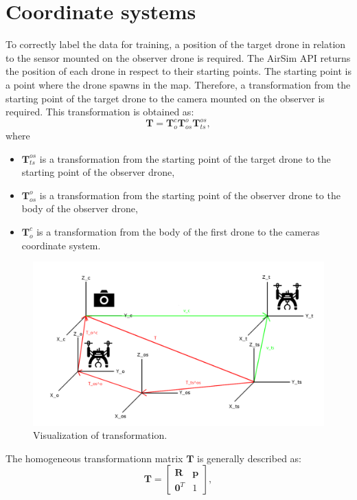 \documentclass[twoside]{ctuthesis}
\theoremstyle{plain}
\theoremstyle{definition}
\theoremstyle{note}
\begin{document}
\section{Coordinate systems}
To correctly label the data for training, a position of the target drone in relation to the sensor mounted on the observer drone is required. The AirSim API returns the position of each drone in respect to their starting points. The starting point is a point where the drone spawns in the map. Therefore, a transformation from the starting point of the target drone to the camera mounted on the observer is required. This transformation is obtained as:
\begin{equation}
	\textbf{T}=\textbf{T}_{o}^{c}\textbf{T}_{os}^{o}\textbf{T}_{ts}^{os},
\end{equation}
where
\begin{itemize}
	\item $\textbf{T}_{ts}^{os}$ is a transformation from the starting point of the target drone to the starting point of the observer drone,
	\item $\textbf{T}_{os}^{o}$ is a transformation from the starting point of the observer drone to the body of the observer drone,
	\item $\textbf{T}_{o}^{c}$ is a transformation from the body of the first drone to the cameras coordinate system.
\end{itemize}
\begin{figure}
	\centering
	\includegraphics[width=\textwidth]{coord_schema.png}
	\caption{Visualization of transformation.}
	\label{fig:trans}
\end{figure}
The homogeneous transformationn matrix $\textbf{T}$ is generally described as:
\begin{equation}
	\textbf{T}=\begin{bmatrix}
		\textbf{R} & \textbf{p}\\
		\textbf{0}^T & 1
	\end{bmatrix},
\end{equation}
\end{document}
